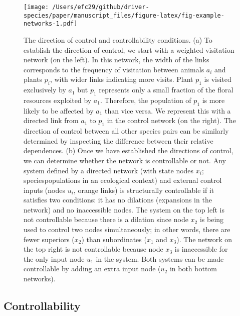 \documentclass[a4paper]{artikel1}
\theoremstyle{definition}
\theoremstyle{definition}
\theoremstyle{definition}
\theoremstyle{remark}
\providecommand{\DIFaddtex}[1]{{\protect\color{blue}\uwave{#1}}} %
\providecommand{\DIFaddFL}[1]{\DIFadd{#1}} %
\providecommand{\DIFaddbeginFL}{} %
\providecommand{\DIFaddendFL}{} %
\providecommand{\DIFadd}[1]{\texorpdfstring{\DIFaddtex{#1}}{#1}} %
\begin{document}
\begin{figure}
\centering
\texttt{[image: /Users/efc29/github/driver-species/paper/manuscript\_files/figure-latex/fig-example-networks-1.pdf]}
\caption{\label{fig:fig-example-networks}The direction of control and
controllability conditions. (a) To establish the direction of control,
we start with a weighted visitation network (on the left). In this
network, the width of the links corresponds to the frequency of
visitation between animals \(a_i\) and plants \(p_i\), with wider links
indicating more visits. Plant \(p_1\) is visited exclusively by \(a_1\)
but \(p_1\) represents only a small fraction of the floral resources
exploited by \(a_1\). Therefore, the population of \(p_1\) is more
likely to be affected by \(a_1\) than vice versa. We represent this with
a directed link from \(a_1\) to \(p_1\) in the control network (on the
right). The direction of control between all other species pairs can be
similarly determined by inspecting the difference between their relative
dependences. (b) Once we have established the directions of control, we
can determine whether the network is controllable or not. Any system
defined by a directed network (with state nodes \(x_i\); species\DIFaddbeginFL \DIFaddFL{'
}\DIFaddendFL populations in an ecological context) and external control inputs (nodes
\(u_i\), orange links) is structurally controllable if it satisfies two
conditions: it has no dilations (expansions in the network) and no
inaccessible nodes. The system on the top left is not controllable
because there is a dilation since node \(x_2\) is being used to control
two nodes simultaneously; in other words, there are fewer superiors
(\(x_2\)) than subordinates (\(x_1\) and \(x_3\)). The network on the
top right is not controllable because node \(x_3\) is inaccessible for
the only input node \(u_1\) in the system. Both systems can be made
controllable by adding an extra input node (\(u_2\) in both bottom
networks).}
\end{figure}

\subsection{Controllability}\label{controllability}
\end{document}
